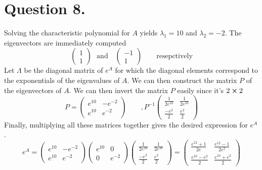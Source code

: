 \documentclass[
	12pt,
	]{article}
\theoremstyle{definition}
\theoremstyle{definition}
\theoremstyle{definition}
\theoremstyle{definition}
\theoremstyle{definition}
\theoremstyle{example}
\theoremstyle{note}
\theoremstyle{remark}
\theoremstyle{example}
\begin{document}
 			 \section*{Question 8.}
 			 	Solving the characteristic polynomial for $A$ yields $\lambda_{1} =10$ and $\lambda_{2} = -2$. The eigenvectors are immediately computed
 			 	$$ \begin{pmatrix}
 			 		1 \\
 			 		1
 			 	\end{pmatrix}
 			 	\ \ \ \text{and  } \ \ \ 
 			 	\begin{pmatrix}
 			 		-1 \\
 			 		1
 			 	\end{pmatrix}\qquad \text{resepctively}$$ 
 			 	Let $\Lambda$ be the diagonal matrix of $e^{A}$ for which the diagonal elements correspond to the exponentials of the eigenvalues of $A$. We can then construct the matrix $P$ of the eigenvectors of $A$. We can then invert the matrix $P$ easily since it's $2\cross 2$
 			 	\begin{equation*}
 			 		P = 
 			 		\begin{pmatrix}
 			 			e^{10} & -e^{-2} \\
 			 			e^{10} & e^{-2}
 			 		\end{pmatrix}\qquad , P^{-1}
 			 		\begin{pmatrix}
 			 			\frac{1}{2e^{10}} & \frac{1}{2e^{10}} \\
 			 			\frac{-e^{2}}{2} & \frac{e^{2}}{2}
 			 		\end{pmatrix}
 			 	\end{equation*}
 			 	Finally, multiplying all these matrices together gives the desired expression for $e^{A}$.
 			 	\begin{equation*}
 			 	e^{A} = 
 			 		\begin{pmatrix}
 			 	 			 			e^{10} & -e^{-2} \\
 			 	 			 			e^{10} & e^{-2}
 			 	 			 		\end{pmatrix}
 			 	 			 		\begin{pmatrix}
 			 	 			 			e^{10}& 0 \\
 			 	 			 			0 & e^{-2}
 			 	 			 		\end{pmatrix}
 			 	\begin{pmatrix}
 			 	 			 			\frac{1}{2e^{10}} & \frac{1}{2e^{10}} \\
 			 	 			 			\frac{-e^{2}}{2} & \frac{e^{2}}{2}
 			 	 			 		\end{pmatrix}
 			 	 			 		 = \begin{pmatrix}
 			 	 			 		 \frac{e^{12 } + 1}{2e} & \frac{e^{12} -1}{2e^{2}} \\
 			 	 			 		 \frac{e^{10} -e^{2}}{2} & \frac{e^{10} + e^{2}}{2}
 			 	 			 		 \end{pmatrix}
 			 	\end{equation*}
	
\end{document}
